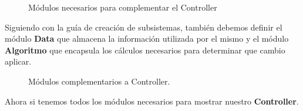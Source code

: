 \begin{figure}[h]
\caption{Módulos necesarios para complementar el Controller}
\begin{center}
\end{center}
\end{figure}

Siguiendo con la guía de creación de subsistemas, también debemos definir el módulo \textbf{Data} que almacena la información utilizada por el mismo y el módulo \textbf{Algoritmo} que encapsula los cálculos necesarios para determinar que cambio aplicar.

\begin{figure}[h]
\caption{Módulos complementarios a Controller.}
\begin{center}
\end{center}
\end{figure}

Ahora si tenemos todos los módulos necesarios para mostrar nuestro \textbf{Controller}.


